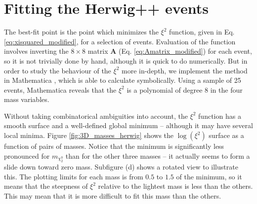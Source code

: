 \documentclass[twoside,english]{uiofysmaster}
\begin{document}


\section{Fitting the {\ttfamily Herwig++} events}
The best-fit point is the point which minimizes the $\xi^2$ function, given in Eq. \eqref{eq:xisquared_modified}, for a selection of events. Evaluation of the function involves inverting the $8\times 8$ matrix $\mathbf{A}$ (Eq. \eqref{eq:Amatrix_modified}) for each event, so it is not trivially done by hand, although it is quick to do numerically. But in order to study the behaviour of the $\xi^2$ more in-depth, we implement the method in Mathematica \cite{Mathematica}, which is able to calculate symbolically. Using a sample of 25 events, Mathematica reveals that the $\xi^2$ is a polynomial of degree 8 in the four mass variables. 

Without taking combinatorical ambiguities into account, the $\xi^2$ function has a smooth surface and a well-defined global minimum -- although it may have several local minima. Figure \ref{fig:3D_masses_herwig} shows the $\log(\xi^2)$ surface as a function of pairs of masses. Notice that the minimum is significantly less pronounced for $m_{\chi_2^0}$ than for the other three masses -- it actually seems to form a slide down toward zero mass. Subfigure (d) shows a rotated view to illustrate this. The plotting limits for each mass is from $0.5$ to $1.5$ of the minimum, so it means that the steepness of $\xi^2$ relative to the lightest mass is less than the others. This may mean that it is more difficult to fit this mass than the others.
\end{document}
